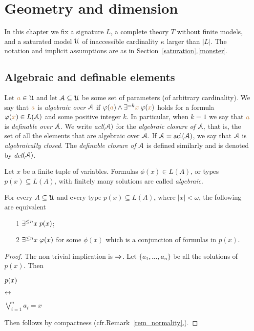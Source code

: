 \chapter{Geometry and dimension}\label{geometria}

\def\medrel#1{\parbox[t]{5ex}{$\displaystyle\hfil #1$}}
\def\ceq#1#2#3{\parbox{35ex}{$\displaystyle #1$}\medrel{#2}$\displaystyle  #3$}

In this chapter we fix a signature $L$, a complete theory $T$ without finite models, and a saturated model $\EuScript U$ of inaccessible cardinality $\kappa$ larger than $|L|$.
The notation and implicit assumptions are as in Section~\hyperref[monster]{\ref*{saturation}.\ref*{monster}}.

\section{Algebraic and definable elements}\label{acl}

Let ${\color{brown} a}\in\EuScript U$ and let $\EuScript A\subseteq\EuScript U$ be some set of parameters (of arbitrary cardinality).
We say that ${\color{brown} a}$ is \emph{algebraic over $\EuScript A$\/} if $\varphi({\color{brown} a})\wedge\exists^{=k}{\color{brown} x}\;\varphi({\color{brown} x})$ holds for a formula $\varphi({\color{brown} x})\in L(\EuScript A)$ and  some positive integer $k$.
In particular, when $k=1$ we say that ${\color{brown} a}$ is \emph{definable over $\EuScript A$}.
We write \emph{acl$(\EuScript A)$} for the \emph{algebraic closure of $\EuScript A$}, that is, the set of all the elements that are algebraic over $\EuScript A$.
If $\EuScript A=\mathop{\rm acl}(\EuScript A)$, we say that $\EuScript A$ is \emph{algebraically closed}.
The \emph{definable closure of $\EuScript A$\/} is defined similarly and is denoted by \emph{dcl$(\EuScript A)$}.

Let $x$ be a finite tuple of variables.
Formulas $\phi(x)\in L(A)$, or types $p(x)\subseteq L(A)$, with finitely many solutions are called \emph{algebraic}.

\begin{proposition}\label{prop_tipialgebrici}
For every $A\subseteq\EuScript U$ and every type $p(x)\subseteq L(A)$, where $|x|<\omega$, the following are equivalent
\begin{itemize} 
\item[1] $\exists^{\le n}x\; p(x)$;
\item[2] $\exists^{\le n}x\;\varphi(x)$ for some $\phi(x)$ which is a conjunction of formulas in $p(x)$.
\end{itemize}
\end{proposition}
\begin{proof} The non trivial implication is $\Rightarrow$.
Let $\{a_1,\dots,a_n\}$ be all the solutions of $p(x)$.
Then 

\ceq{\hfill p(x)}{\iff}{\bigvee^n_{i=1}a_i=x}

Then  follows by compactness (cfr.\@ Remark~\hyperref[rem_normality]{\ref*{rem_normality}.}).
\end{proof}

